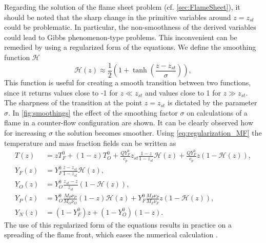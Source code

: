 Regarding the solution of the flame sheet problem (cf. \cref{sec:FlameSheet}), it should be noted that the sharp change in the primitive variables around $z = z_{st}$  could be problematic. In particular, the non-smoothness of the derived variables could lead to Gibbs phenomenon-type problems. This inconvenient can be remedied by using a regularized form of the equations. We define the smoothing function $\mathcal{H}$
\begin{equation}\label{eq:regularization_MF}
\mathcal{H}(z) \approx \frac{1}{2}(1+\tanh(\frac{z - z_{st} }{\sigma} )),
\end{equation}
This function is useful for creating a smooth transition between two functions, since it returns values close to -1 for $z \ll z_{st}$ and values close to 1 for $z \gg z_{st}$. The sharpness of the transition at the point $z = z_{st}$   is dictated by the parameter $\sigma$. In \cref{fig:smoothings} the effect of the smoothing factor $\sigma$ on calculations of a flame in a counter-flow configuration are shown. It can be clearly observed how for increasing $\sigma$ the solution becomes smoother. Using \cref{eq:regularization_MF} the temperature and mass fraction fields can be written as
\begin{subequations}
	\begin{align}
	T(z) &= z T_F^0 + (1-z)T_O^0 + \frac{Q Y_F^0}{c_p} z_{st}\frac{1- z}{1-z_{st}}\mathcal{H}(z) +  \frac{Q Y_F^0}{c_p}z\left(1-\mathcal{H}(z)\right),  \label{eq:BS-TR} \\[1ex]
	Y_F(z) &= Y_F^0\frac{z - z_{st}}{1-z_{st}} \mathcal{H}(z), \label{eq:BS-YFR} \\[1ex]
	Y_O(z) &= Y_O^0 \frac{z_{st}-z}{z_{st}} (1-\mathcal{H}(z)), \label{eq:BS-YOR}\\[1ex]
	Y_P(z) &=  Y_O^0\frac{M_P\nu_P}{M_O\nu_O}(1-z)\mathcal{H}(z) +	Y_F^0\frac{M_P\nu_P}{M_F\nu_F}z (1-\mathcal{H}(z)), \label{eq:BS-YPR}\\[1ex]
	Y_N(z) &= (1-Y_F^0)z + (1-Y_O^0)(1-z). \label{eq:BS-YNR}
	\end{align}
\end{subequations}
The use of this regularized form of the equations results in practice on a spreading of the flame front, which eases the numerical calculation \citep{braackAdaptiveFiniteElement1997}.

